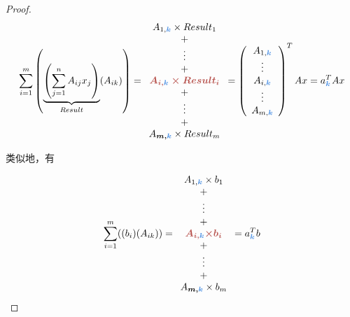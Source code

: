 \begin{proof}
    $$\displaystyle \sum _{i=1}^{m}\left(\underbrace{\left(\sum _{j=1}^{n} A_{ij} x_{j}\right)}_{Result}( A_{ik})\right) =\begin{array}{ c }
    A_{1,\textcolor[rgb]{0.29,0.56,0.89}{\boldsymbol{k}}} \times Result_{1}\\
    +\\
    \vdots \\
    +\\
    \boldsymbol{\textcolor[rgb]{0.72,0.33,0.31}{A_{i,\textcolor[rgb]{0.29,0.56,0.89}{\boldsymbol{k}}} \times Result}\textcolor[rgb]{0.72,0.33,0.31}{_{i}}}\\
    +\\
    \vdots \\
    +\\
    A\textcolor[rgb]{0.29,0.56,0.89}{\boldsymbol{_{\textcolor[rgb]{0,0,0}{m,} k}}} \times Result_{m}
    \end{array} =\left(\begin{array}{ c }
    A_{1,\textcolor[rgb]{0.29,0.56,0.89}{\boldsymbol{k}}}\\
    \vdots \\
    A_{i,\textcolor[rgb]{0.29,0.56,0.89}{\boldsymbol{k}}}\\
    \vdots \\
    A_{m,\textcolor[rgb]{0.29,0.56,0.89}{\boldsymbol{k}}}
    \end{array}\right)^{T} Ax=a_{\textcolor[rgb]{0.29,0.56,0.89}{\boldsymbol{k}}}^{T} Ax$$
        
    类似地，有 
    
    $$\displaystyle \sum _{i=1}^{m}(( b_{i})( A_{ik})) =\begin{array}{ c }
    A_{1,\textcolor[rgb]{0.29,0.56,0.89}{\boldsymbol{k}}} \times b_{1}\\
    +\\
    \vdots \\
    +\\
    \boldsymbol{\textcolor[rgb]{0.72,0.33,0.31}{A}\textcolor[rgb]{0.72,0.33,0.31}{_{i,\textcolor[rgb]{0.29,0.56,0.89}{\boldsymbol{k}}}}\textcolor[rgb]{0.72,0.33,0.31}{\times b}\textcolor[rgb]{0.72,0.33,0.31}{_{i}}}\\
    +\\
    \vdots \\
    +\\
    A\textcolor[rgb]{0.29,0.56,0.89}{\boldsymbol{_{\textcolor[rgb]{0,0,0}{m,} k}}} \times b_{m}
    \end{array} =a_{\textcolor[rgb]{0.29,0.56,0.89}{\boldsymbol{k}}}^{T} b$$
        

\end{proof}
